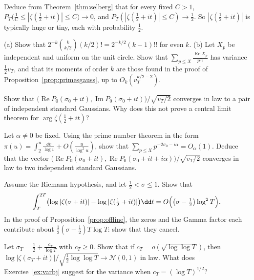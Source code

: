 \begin{exercise}[$\star$]\label{ex:typical}
Deduce from Theorem~\ref{thm:selberg} that for every fixed $C>1$, $P_T\bigl(\frac1C\le|\zeta(\frac12+it)|\le C\bigr)\to0$, and $P_T(|\zeta(\frac12+it)|\le C)\to\frac12$. So $|\zeta(\frac12+it)|$ is typically huge or tiny, each with probability $\frac12$.
\end{exercise}

\begin{exercise}[$\star$]\label{ex:half}
(a) Show that $2^{-k}\binom k{k/2}(k/2)!=2^{-k/2}(k-1)!!$ for even $k$. (b) Let $X_p$ be independent and uniform on the unit circle. Show that $\sum_{p\le X}\frac{\operatorname{Re}X_p}{p^{\sigma_0}}$ has variance $\frac12v_T$, and that its moments of order $k$ are those found in the proof of Proposition~\ref{prop:primesgauss}, up to $O_k(v_T^{k/2-2})$.
\end{exercise}

\begin{exercise}[$\star\star$]\label{ex:complexgauss}
Show that $\bigl(\operatorname{Re}P_0(\sigma_0+it),\operatorname{Im}P_0(\sigma_0+it)\bigr)/\sqrt{v_T/2}$ converges in law to a pair of independent standard Gaussians. Why does this not prove a central limit theorem for $\arg\zeta(\frac12+it)$?
\end{exercise}

\begin{exercise}[$\star\star\star$]\label{ex:twopoint}
Let $\alpha\ne0$ be fixed. Using the prime number theorem in the form $\pi(u)=\int_2^u\frac{\dd v}{\log v}+O(\frac u{\log^2u})$, show that $\sum_{p\le X}p^{-2\sigma_0-i\alpha}=O_\alpha(1)$. Deduce that the vector $\bigl(\operatorname{Re}P_0(\sigma_0+it),\operatorname{Re}P_0(\sigma_0+it+i\alpha)\bigr)/\sqrt{v_T/2}$ converges in law to two independent standard Gaussians.
\end{exercise}

\begin{exercise}[$\star\star\star$]\label{ex:meandiff}
Assume the Riemann hypothesis, and let $\frac12<\sigma\le1$. Show that
\[
\int_T^{2T}\bigl(\log|\zeta(\sigma+it)|-\log|\zeta(\tfrac12+it)|\bigr)\dd t=O\Bigl(\bigl(\sigma-\tfrac12\bigr)\log^2T\Bigr).
\]
In the proof of Proposition~\ref{prop:offline}, the zeros and the Gamma factor each contribute about $\frac12(\sigma-\frac12)T\log T$: show that they cancel.
\end{exercise}

\begin{exercise}[$\star$]\label{ex:fixedW}
Let $\sigma_T=\frac12+\frac{c_T}{\log T}$ with $c_T\ge0$. Show that if $c_T=o(\sqrt{\log\log T})$, then $\log|\zeta(\sigma_T+it)|/\sqrt{\frac12\log\log T}\to\mathcal N(0,1)$ in law. What does Exercise~\ref{ex:varbj} suggest for the variance when $c_T=(\log T)^{1/2}$?
\end{exercise}

